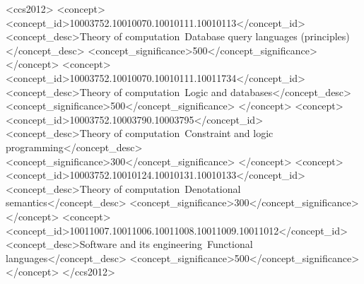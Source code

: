 \documentclass[acmsmall]{acmart}\settopmatter{}
\begin{document}

 \begin{CCSXML}
<ccs2012>
<concept>
<concept_id>10003752.10010070.10010111.10010113</concept_id>
<concept_desc>Theory of computation~Database query languages (principles)</concept_desc>
<concept_significance>500</concept_significance>
</concept>
<concept>
<concept_id>10003752.10010070.10010111.10011734</concept_id>
<concept_desc>Theory of computation~Logic and databases</concept_desc>
<concept_significance>500</concept_significance>
</concept>
<concept>
<concept_id>10003752.10003790.10003795</concept_id>
<concept_desc>Theory of computation~Constraint and logic programming</concept_desc>
<concept_significance>300</concept_significance>
</concept>
<concept>
<concept_id>10003752.10010124.10010131.10010133</concept_id>
<concept_desc>Theory of computation~Denotational semantics</concept_desc>
<concept_significance>300</concept_significance>
</concept>
<concept>
<concept_id>10011007.10011006.10011008.10011009.10011012</concept_id>
<concept_desc>Software and its engineering~Functional languages</concept_desc>
<concept_significance>500</concept_significance>
</concept>
</ccs2012>
\end{CCSXML}




\maketitle
\end{document}
